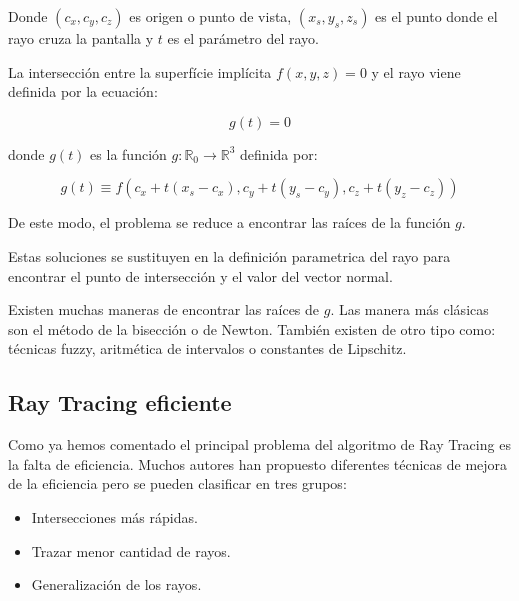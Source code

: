 Donde $(c_x,c_y,c_z)$ es origen o punto de vista, $(x_s,y_s,z_s)$ es el punto donde el rayo cruza la pantalla y $t$ es el parámetro del rayo.
\par La intersección entre la superfície implícita $f(x,y,z) = 0$ y el rayo viene definida por la ecuación:

$$g(t) = 0$$

donde $g(t)$ es la función $g : \mathbb{R}_0 \to \mathbb{R}^3$ definida por:

$$g(t) \equiv f(c_x + t(x_s - c_x), c_y + t(y_s - c_y), c_z + t(y_z - c_z))$$

De este modo, el problema se reduce a encontrar las raíces de la función $g$.
\par Estas soluciones se sustituyen en la definición parametrica del rayo para encontrar el punto de intersección y el valor del vector normal.
\par Existen muchas maneras  de encontrar las raíces de $g$. Las manera más clásicas son el método de la bisección o de Newton\cite{Hart01}. También existen de otro tipo como: técnicas fuzzy,\cite{Foufou96} aritmética de intervalos\cite{Mitchell90} o constantes de Lipschitz.\cite{Kalra89}

\subsection{Ray Tracing eficiente}

Como ya hemos comentado el principal problema del algoritmo de Ray Tracing es la falta de eficiencia. Muchos autores han propuesto diferentes técnicas de mejora de la eficiencia pero se pueden clasificar en tres grupos:

\begin{itemize}
\item Intersecciones más rápidas.
\item Trazar menor cantidad de rayos.
\item Generalización de los rayos.
\end{itemize}

